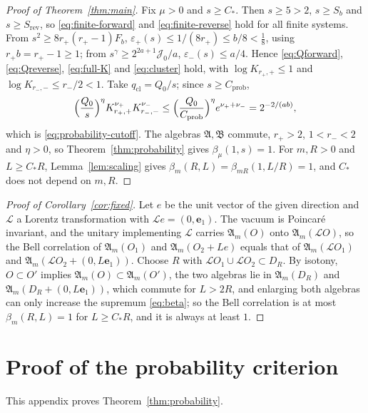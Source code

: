 \documentclass[aps,prl,reprint,longbibliography,raggedbottom]{revtex4-2}
\newcommand{\A}{\mathfrak A}
\newcommand{\B}{\mathfrak B}
\newcommand{\eone}{\mathbf e_1}
\begin{document}
\begin{proof}[Proof of Theorem~\ref{thm:main}]
Fix $\mu>0$ and $s\ge C_*$. Then $s\ge5>2$, $s\ge S_b$ and
$s\ge S_{\mathrm{rev}}$, so \eqref{eq:finite-forward} and
\eqref{eq:finite-reverse} hold for all finite systems. From
$s^2\ge8r_+(r_+-1)F_b$, $\varepsilon_+(s)\le1/(8r_+)\le b/8<\frac18$,
using $r_+b=r_+-1\ge1$; from $s^\gamma\ge2^{2a+1}\mathcal J_0/a$,
$\varepsilon_-(s)\le a/4$.
Hence \eqref{eq:Qforward}, \eqref{eq:Qreverse}, \eqref{eq:full-K} and
\eqref{eq:cluster} hold, with $\log K_{r_+,+}\le1$ and
$\log K_{r_-,-}\le r_-/2<1$. Take $q_{\mathrm{cl}}=Q_0/s$; since
$s\ge C_{\mathrm{prob}}$,
\[
\Bigl(\frac{Q_0}s\Bigr)^\eta K_{r_+,+}^{\nu_+}K_{r_-,-}^{\nu_-}
\le\Bigl(\frac{Q_0}{C_{\mathrm{prob}}}\Bigr)^\eta e^{\nu_++\nu_-}
=2^{-2/(ab)},
\]
which is \eqref{eq:probability-cutoff}. The algebras $\A,\B$ commute,
$r_+>2$, $1<r_-<2$ and $\eta>0$, so Theorem~\ref{thm:probability} gives
$\beta_\mu(1,s)=1$. For $m,R>0$ and $L\ge C_*R$,
Lemma~\ref{lem:scaling} gives $\beta_m(R,L)=\beta_{mR}(1,L/R)=1$, and
$C_*$ does not depend on $m,R$.
\end{proof}

\begin{proof}[Proof of Corollary~\ref{cor:fixed}]
Let $e$ be the unit vector of the given direction and $\mathcal L$ a
Lorentz transformation with $\mathcal Le=(0,\eone)$. The vacuum is
Poincar\'e invariant, and the unitary implementing $\mathcal L$ carries
$\A_m(O)$ onto $\A_m(\mathcal LO)$, so the Bell correlation of
$\A_m(O_1)$ and $\A_m(O_2+Le)$ equals that of $\A_m(\mathcal LO_1)$
and $\A_m(\mathcal LO_2+(0,L\eone))$. Choose $R$ with
$\mathcal LO_1\cup\mathcal LO_2\subset D_R$. By isotony,
$O\subset O'$ implies $\A_m(O)\subset\A_m(O')$, the two algebras
lie in $\A_m(D_R)$ and $\A_m(D_R+(0,L\eone))$, which commute for
$L>2R$, and enlarging both algebras can only increase the supremum
\eqref{eq:beta}; so the Bell correlation is at most $\beta_m(R,L)=1$
for $L\ge C_*R$, and it is always at least $1$.
\end{proof}

\appendix

\section{Proof of the probability criterion}\label{app:probability}

This appendix proves Theorem~\ref{thm:probability}.
\end{document}
